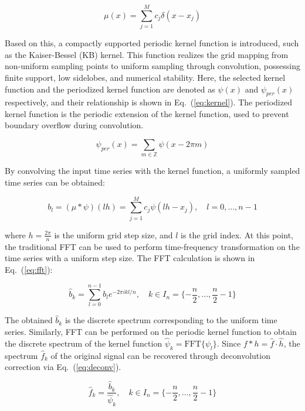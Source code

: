 \documentclass[letterpaper,journal]{IEEEtran}
\begin{document}
\begin{equation}
\label{eq:pulse}
\mu(x) = \sum_{j=1}^{M} c_j \delta(x - x_j)
\end{equation}

Based on this, a compactly supported periodic kernel function is introduced, such as the Kaiser-Bessel (KB) kernel. This function realizes the grid mapping from non-uniform sampling points to uniform sampling through convolution, possessing finite support, low sidelobes, and numerical stability. Here, the selected kernel function and the periodized kernel function are denoted as $\psi(x)$ and $\psi_{per}(x)$ respectively, and their relationship is shown in Eq.~(\ref{eq:kernel}). The periodized kernel function is the periodic extension of the kernel function, used to prevent boundary overflow during convolution.

\begin{equation}
\label{eq:kernel}
\psi_{per}(x) = \sum_{m \in \mathbb{Z}} \psi(x - 2\pi m)
\end{equation}

By convolving the input time series with the kernel function, a uniformly sampled time series can be obtained:

\begin{equation}
\label{eq:conv}
b_l = (\mu * \psi)(lh) = \sum_{j=1}^{M} c_j \psi(lh - x_j), \quad l = 0, ..., n - 1
\end{equation}

where $h = \frac{2\pi}{n}$ is the uniform grid step size, and $l$ is the grid index. At this point, the traditional FFT can be used to perform time-frequency transformation on the time series with a uniform step size. The FFT calculation is shown in Eq.~(\ref{eq:fft}):

\begin{equation}
\label{eq:fft}
\hat{b}_k = \sum_{l=0}^{n-1} b_l e^{-2\pi i k l / n}, \quad k \in I_n = \{-\frac{n}{2}, ..., \frac{n}{2}-1\}
\end{equation}

The obtained $\hat{b}_k$ is the discrete spectrum corresponding to the uniform time series. Similarly, FFT can be performed on the periodic kernel function to obtain the discrete spectrum of the kernel function $\hat{\psi}_k = \text{FFT}\{\psi_l\}$. Since $f * h = \hat{f} \cdot \hat{h}$, the spectrum $\hat{f}_k$ of the original signal can be recovered through deconvolution correction via Eq.~(\ref{eq:deconv}).

\begin{equation}
\label{eq:deconv}
\hat{f}_k = \frac{\hat{b}_k}{\hat{\psi}_k}, \quad k \in I_n = \{-\frac{n}{2}, ..., \frac{n}{2}-1\}
\end{equation}
\end{document}

